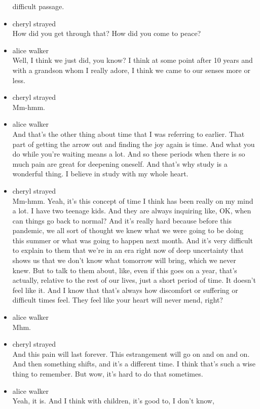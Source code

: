 \begin{itemize}
  difficult passage.
\item
  cheryl strayed\\
  How did you get through that? How did you come to peace?
\item
  alice walker\\
  Well, I think we just did, you know? I think at some point after 10
  years and with a grandson whom I really adore, I think we came to our
  senses more or less.
\item
  cheryl strayed\\
  Mm-hmm.
\item
  alice walker\\
  And that's the other thing about time that I was referring to earlier.
  That part of getting the arrow out and finding the joy again is time.
  And what you do while you're waiting means a lot. And so these periods
  when there is so much pain are great for deepening oneself. And that's
  why study is a wonderful thing. I believe in study with my whole
  heart.
\item
  cheryl strayed\\
  Mm-hmm. Yeah, it's this concept of time I think has been really on my
  mind a lot. I have two teenage kids. And they are always inquiring
  like, OK, when can things go back to normal? And it's really hard
  because before this pandemic, we all sort of thought we knew what we
  were going to be doing this summer or what was going to happen next
  month. And it's very difficult to explain to them that we're in an era
  right now of deep uncertainty that shows us that we don't know what
  tomorrow will bring, which we never knew. But to talk to them about,
  like, even if this goes on a year, that's actually, relative to the
  rest of our lives, just a short period of time. It doesn't feel like
  it. And I know that that's always how discomfort or suffering or
  difficult times feel. They feel like your heart will never mend,
  right?
\item
  alice walker\\
  Mhm.
\item
  cheryl strayed\\
  And this pain will last forever. This estrangement will go on and on
  and on. And then something shifts, and it's a different time. I think
  that's such a wise thing to remember. But wow, it's hard to do that
  sometimes.
\item
  alice walker\\
  Yeah, it is. And I think with children, it's good to, I don't know,

\end{itemize}
